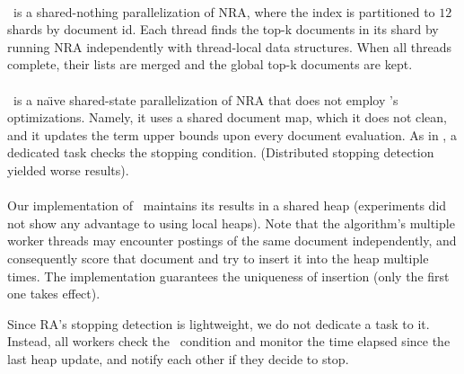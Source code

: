 {\paragraph{\sNRA}
\sNRA\ is a shared-nothing parallelization of NRA, where the index is partitioned to $12$ shards by document id. 
Each thread finds the top-k documents in its shard by running NRA independently with thread-local data structures. 
When all threads complete, their lists are merged and the global top-k documents are kept.  

\paragraph{\pNRA}
\pNRA\ is a na\"{\i}ve shared-state parallelization of NRA that does not employ \alg's optimizations. 
Namely, it uses a shared document map, which it does not clean, and it updates the term
upper bounds upon every document evaluation. As in \alg, a dedicated task checks the stopping condition.
(Distributed stopping detection yielded worse results).


\paragraph{\pRA}
Our implementation of \pRA\ maintains its results in a shared heap (experiments did not show any advantage to using local heaps).
Note that the algorithm's multiple worker threads may encounter postings of the same document independently, 
and consequently score that document and try to insert it into the heap multiple times. The implementation guarantees 
the uniqueness of insertion (only the first one takes effect).

Since RA's stopping detection is lightweight, we do not dedicate a task to it. Instead, all workers check the  
\RAStop\ condition and monitor the time elapsed since the last heap update, and notify each other if they 
decide to stop.



}
